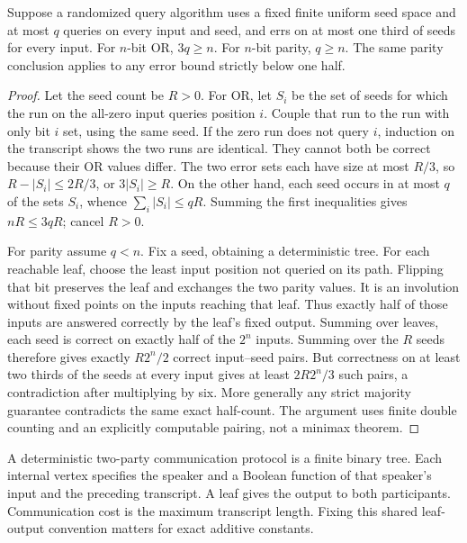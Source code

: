 \begin{theorem}\label{thm:R17}
Suppose a randomized query algorithm uses a fixed finite uniform seed
space and at most $q$ queries on every input and seed, and errs on at
most one third of seeds for every input. For $n$-bit OR, $3q\geq n$.
For $n$-bit parity, $q\geq n$. The same parity conclusion applies to any
error bound strictly below one half.
\end{theorem}
\begin{proof}
Let the seed count be $R>0$. For OR, let $S_i$ be the set of seeds for
which the run on the all-zero input queries position $i$. Couple that
run to the run with only bit $i$ set, using the same seed. If the zero
run does not query $i$, induction on the transcript shows the two runs
are identical. They cannot both be correct because their OR values
differ. The two error sets each have size at most $R/3$, so
$R-|S_i|\leq2R/3$, or $3|S_i|\geq R$. On the other hand, each seed
occurs in at most $q$ of the sets $S_i$, whence
$\sum_i|S_i|\leq qR$. Summing the first inequalities gives
$nR\leq3qR$; cancel $R>0$.

For parity assume $q<n$. Fix a seed, obtaining a deterministic tree.
For each reachable leaf, choose the least input position not queried on
its path. Flipping that bit preserves the leaf and exchanges the two
parity values. It is an involution without fixed points on the inputs
reaching that leaf. Thus exactly half of those inputs are answered
correctly by the leaf's fixed output. Summing over leaves, each seed is
correct on exactly half of the $2^n$ inputs. Summing over the $R$ seeds
therefore gives exactly $R2^n/2$ correct input--seed pairs. But correctness
on at least two thirds of the seeds at every input gives at least
$2R2^n/3$ such pairs, a contradiction after multiplying by six. More
generally any strict majority guarantee contradicts the same exact
half-count. The argument uses finite double counting and an explicitly
computable pairing, not a minimax theorem.
\end{proof}

A deterministic two-party communication protocol is a finite binary tree.
Each internal vertex specifies the speaker and a Boolean function of
that speaker's input and the preceding transcript. A leaf gives the
output to both participants. Communication cost is the maximum transcript
length. Fixing this shared leaf-output convention matters for exact
additive constants.

